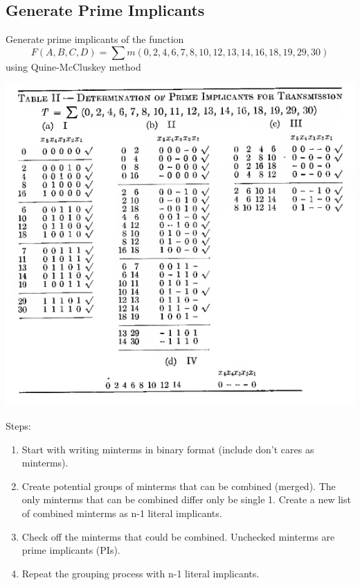 \subsection{Generate Prime Implicants}

\begin{example}
  Generate prime implicants of the function 
  \[ F (A, B, C, D) = \sum m(0, 2, 4, 6, 7,
  8, 10, 12, 13, 14, 16, 18, 19, 29, 30)\]
  using Quine-McCluskey method
\end{example}
\includegraphics[width=0.9\linewidth]{1956-mccluskey-table-2.png}

Steps:
\begin{enumerate}
  \item Start with writing minterms in binary format (include don't cares as minterms).
  \item Create potential groups of minterms that can be combined (merged). The only
    minterms that can be combined differ only be single 1. Create a new list of
    combined minterms as n-1 literal implicants.
  \item Check off the minterms that could be combined. Unchecked minterms are
    prime implicants (PIs).
  \item Repeat the grouping process with n-1 literal implicants.
\end{enumerate}


